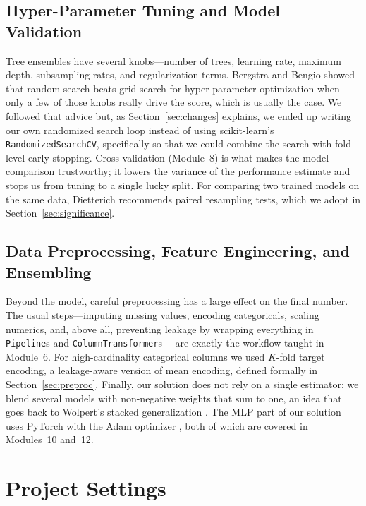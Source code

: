 \documentclass[journal]{IEEEtran}
\begin{document}
\subsection{Hyper-Parameter Tuning and Model Validation}
Tree ensembles have several knobs---number of trees, learning rate, maximum
depth, subsampling rates, and regularization terms. Bergstra and Bengio
\cite{bergstra2012random} showed that random search beats grid search for
hyper-parameter optimization when only a few of those knobs really drive the
score, which is usually the case. We followed that advice but, as
Section~\ref{sec:changes} explains, we ended up writing our own randomized
search loop instead of using scikit-learn's \texttt{RandomizedSearchCV},
specifically so that we could combine the search with fold-level early stopping.
Cross-validation (Module~8) is what makes the model comparison trustworthy; it
lowers the variance of the performance estimate and stops us from tuning to a
single lucky split. For comparing two trained models on the same data,
Dietterich \cite{dietterich1998} recommends paired resampling tests, which we
adopt in Section~\ref{sec:significance}.

\subsection{Data Preprocessing, Feature Engineering, and Ensembling}
Beyond the model, careful preprocessing has a large effect on the final number.
The usual steps---imputing missing values, encoding categoricals, scaling
numerics, and, above all, preventing leakage by wrapping everything in
\texttt{Pipeline}s and \texttt{ColumnTransformer}s
\cite{pedregosa2011sklearn}---are exactly the workflow taught in Module~6. For
high-cardinality categorical columns we used $K$-fold target encoding, a
leakage-aware version of mean encoding, defined formally in
Section~\ref{sec:preproc}. Finally, our solution does not rely on a single
estimator: we blend several models with non-negative weights that sum to one, an
idea that goes back to Wolpert's stacked generalization \cite{wolpert1992stacked}.
The MLP part of our solution uses PyTorch \cite{paszke2019pytorch} with the Adam
optimizer \cite{kingma2015adam}, both of which are covered in Modules~10 and~12.

\section{Project Settings}
\label{sec:settings}
\end{document}
